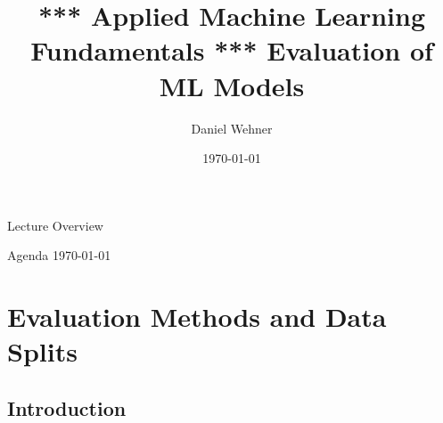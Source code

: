


\title[Evaluation of ML Models]{*** Applied Machine Learning Fundamentals *** Evaluation of ML Models}
\author{Daniel Wehner}
\date{\today}




\maketitlepage


\begin{frame}{Lecture Overview}{}
\end{frame}


\begin{frame}{Agenda \today}
	\begin{multicols}{2}
		\tableofcontents
	\end{multicols}
\end{frame}


\section{Evaluation Methods and Data Splits}

\subsection{Introduction}

